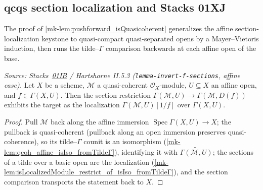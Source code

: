 \subsection{qcqs section localization and Stacks 01XJ}
\label{mk-sec:quot_qcqs_section_localization}

The proof of \ref{mk-lem:pushforward_isQuasicoherent} generalizes the affine
section-localization keystone to quasi-compact quasi-separated opens by a
Mayer--Vietoris induction, then runs the tilde--$\Gamma$ comparison backwards
at each affine open of the base.

\begin{lemma}
  \label{mk-lem:qcoh_section_localization_basicOpen}
  \leanok

  \textit{Source: Stacks~\href{https://stacks.math.columbia.edu/tag/01IB}{01IB}
  / Hartshorne II.5.3 (\texttt{lemma-invert-f-sections}, affine case).}
  Let $X$ be a scheme, $\mathcal{M}$ a quasi-coherent
  $\mathcal{O}_X$-module, $U \subseteq X$ an affine open, and
  $f \in \Gamma(X, U)$. Then the section restriction
  $\Gamma(\mathcal{M}, U) \to \Gamma(\mathcal{M}, D(f))$ exhibits the target as
  the localization $\Gamma(\mathcal{M}, U)[1/f]$ over $\Gamma(X, U)$.
\end{lemma}
\begin{proof}
  \leanok
  Pull $\mathcal{M}$ back along the affine immersion
  $\operatorname{Spec} \Gamma(X, U) \to X$; the pullback is quasi-coherent
  (pullback along an open immersion preserves quasi-coherence), so its
  tilde--$\Gamma$ counit is an isomorphism
  (\ref{mk-lem:qcoh_affine_isIso_fromTildeΓ}), identifying it with
  $\widetilde{\Gamma(\mathcal{M}, U)}$; the sections of a tilde over a basic
  open are the localization
  (\ref{mk-lem:isLocalizedModule_restrict_of_isIso_fromTildeΓ}), and the
  section comparison transports the statement back to $X$.
\end{proof}


